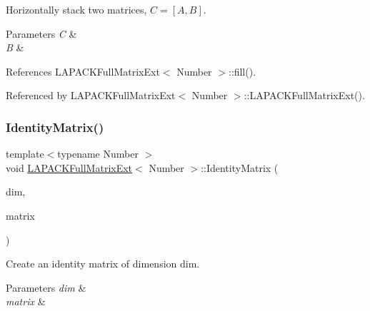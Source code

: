 Horizontally stack two matrices, $C = [A, B]$. 
\begin{DoxyParams}{Parameters}
{\em C} & \\
\hline
{\em B} & \\
\hline
\end{DoxyParams}


References L\+A\+P\+A\+C\+K\+Full\+Matrix\+Ext$<$ Number $>$\+::fill().



Referenced by L\+A\+P\+A\+C\+K\+Full\+Matrix\+Ext$<$ Number $>$\+::\+L\+A\+P\+A\+C\+K\+Full\+Matrix\+Ext().

\mbox{\label{classLAPACKFullMatrixExt_a6599cc906b61cd77203daeeb06735daa}} 
\subsubsection{\texorpdfstring{Identity\+Matrix()}{IdentityMatrix()}}
{\footnotesize\ttfamily template$<$typename Number $>$ \\
void \hyperlink{classLAPACKFullMatrixExt}{L\+A\+P\+A\+C\+K\+Full\+Matrix\+Ext}$<$ Number $>$\+::Identity\+Matrix (\begin{DoxyParamCaption}\item[{const \hyperlink{classLAPACKFullMatrixExt_a5cf5f4a6104dc17029210b5ca52bf574}{size\+\_\+type}}]{dim,  }\item[{\hyperlink{classLAPACKFullMatrixExt}{L\+A\+P\+A\+C\+K\+Full\+Matrix\+Ext}$<$ Number $>$ \&}]{matrix }\end{DoxyParamCaption})\hspace{0.3cm}{\ttfamily [static]}}

Create an identity matrix of dimension {\ttfamily dim}. 
\begin{DoxyParams}{Parameters}
{\em dim} & \\
\hline
{\em matrix} & \\
\hline
\end{DoxyParams}
\mbox{\label{classLAPACKFullMatrixExt_a13bbc430a0f60d4158d1693a2d7a0235}} 
